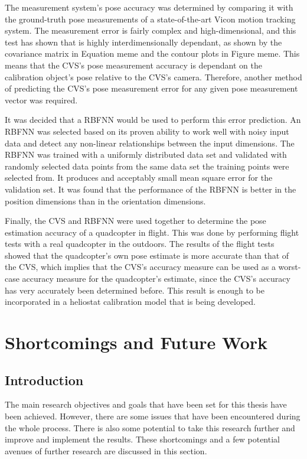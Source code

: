 The measurement system's pose accuracy was determined by comparing it with the ground-truth pose measurements of a state-of-the-art Vicon motion tracking system. The measurement error is fairly complex and high-dimensional, and this test has shown that is highly interdimensionally dependant, as shown by the covariance matrix in Equation meme and the contour plots in Figure meme. This means that the CVS's pose measurement accuracy is dependant on the calibration object's pose relative to the CVS's camera. Therefore, another method of predicting the CVS's pose measurement error for any given pose measurement vector was required.

It was decided that a RBFNN would be used to perform this error prediction. An RBFNN was selected based on its proven ability to work well with noisy input data and detect any non-linear relationships between the input dimensions. The RBFNN was trained with a uniformly distributed data set and validated with randomly selected data points from the same data set the training points were selected from. It produces and acceptably small mean square error for the validation set. It was found that the performance of the RBFNN is better in the position dimensions than in the orientation dimensions. 

Finally, the CVS and RBFNN were used together to determine the pose estimation accuracy of a quadcopter in flight. This was done by performing flight tests with a real quadcopter in the outdoors. The results of the flight tests showed that the quadcopter's own pose estimate is more accurate than that of the CVS, which implies that the CVS's accuracy measure can be used as a worst-case accuracy measure for the quadcopter's estimate, since the CVS's accuracy has very accurately been determined before. This result is enough to be incorporated in a heliostat calibration model that is being developed. 

\section{Shortcomings and Future Work}

\subsection{Introduction}

The main research objectives and goals that have been set for this thesis have been achieved. However, there are some issues that have been encountered during the whole process. There is also some potential to take this research further and improve and implement the results. These shortcomings and a few potential avenues of further research are discussed in this section. 

